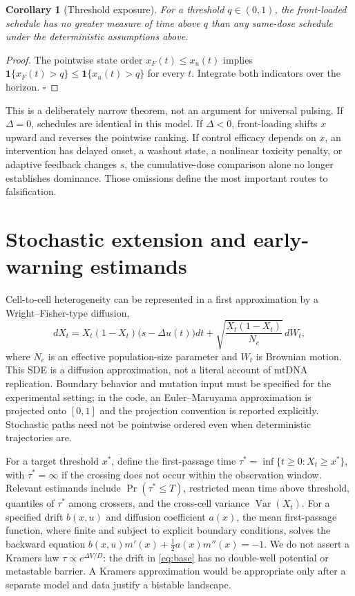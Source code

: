 \documentclass[11pt]{article}
\newtheorem{corollary}{Corollary}
\begin{document}
\begin{corollary}[Threshold exposure]
For a threshold $q\in(0,1)$, the front-loaded schedule has no greater measure of time above $q$ than any same-dose schedule under the deterministic assumptions above.
\end{corollary}
\begin{proof}
The pointwise state order $x_F(t)\leq x_u(t)$ implies $\mathbf{1}\{x_F(t)>q\}\leq\mathbf{1}\{x_u(t)>q\}$ for every $t$. Integrate both indicators over the horizon. $\square$
\end{proof}

This is a deliberately narrow theorem, not an argument for universal pulsing. If $\Delta=0$, schedules are identical in this model. If $\Delta<0$, front-loading shifts $x$ upward and reverses the pointwise ranking. If control efficacy depends on $x$, an intervention has delayed onset, a washout state, a nonlinear toxicity penalty, or adaptive feedback changes $s$, the cumulative-dose comparison alone no longer establishes dominance. Those omissions define the most important routes to falsification.

\section{Stochastic extension and early-warning estimands}
Cell-to-cell heterogeneity can be represented in a first approximation by a Wright--Fisher-type diffusion,
\begin{equation}
 dX_t=X_t(1-X_t)\bigl(s-\Delta u(t)\bigr)dt+\sqrt{\frac{X_t(1-X_t)}{N_e}}\,dW_t,
 \label{eq:sde}
\end{equation}
where $N_e$ is an effective population-size parameter and $W_t$ is Brownian motion. This SDE is a diffusion approximation, not a literal account of mtDNA replication. Boundary behavior and mutation input must be specified for the experimental setting; in the code, an Euler--Maruyama approximation is projected onto $[0,1]$ and the projection convention is reported explicitly. Stochastic paths need not be pointwise ordered even when deterministic trajectories are.

For a target threshold $x^*$, define the first-passage time $\tau^*=\inf\{t\geq0:X_t\geq x^*\}$, with $\tau^*=\infty$ if the crossing does not occur within the observation window. Relevant estimands include $\Pr(\tau^*\leq T)$, restricted mean time above threshold, quantiles of $\tau^*$ among crossers, and the cross-cell variance $\operatorname{Var}(X_t)$. For a specified drift $b(x,u)$ and diffusion coefficient $a(x)$, the mean first-passage function, where finite and subject to explicit boundary conditions, solves the backward equation $b(x,u)m'(x)+\frac12a(x)m''(x)=-1$. We do not assert a Kramers law $\tau\propto e^{\Delta V/D}$: the drift in \eqref{eq:base} has no double-well potential or metastable barrier. A Kramers approximation would be appropriate only after a separate model and data justify a bistable landscape.
\end{document}
